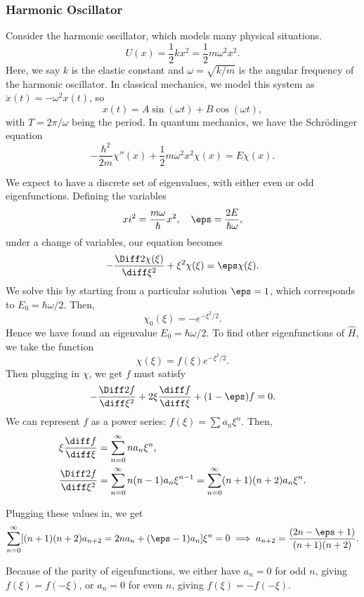 \documentclass[12pt]{article}
\begin{document}
\subsubsection{Harmonic Oscillator}%
\label{subsub:harmonic_oscillator}

Consider the harmonic oscillator, which models many physical situations.
\[
	U(x) = \frac{1}{2}k x^2 = \frac{1}{2}m \omega^2 x^2
.\]
Here, we say $k$ is the elastic constant and $\omega = \sqrt{k/m}$ is the angular frequency of the harmonic oscillator. In classical mechanics, we model this system as $\ddot x (t) = - \omega^2 x(t)$, so
\[
	x(t) = A \sin (\omega t) + B \cos (\omega t)
,\]
with $T = 2\pi/\omega$ being the period. In quantum mechanics, we have the Schr\"{o}dinger equation
\[
	- \frac{\hbar^2}{2m} \chi''(x) + \frac{1}{2} m \omega^2 x^2 \chi(x) =  E \chi(x)
.\]

We expect to have a discrete set of eigenvalues, with either even or odd eigenfunctions. Defining the variables
\[
\\xi^2 = \frac{m \omega}{\hbar} x^2, \quad \eps = \frac{2E}{\hbar \omega}
,\]
under a change of variables, our equation becomes
\[
	- \frac{\Diff2 \chi(\xi)}{\diff \xi^2} + \xi^2 \chi(\xi) = \eps \chi(\xi)
.\]
We solve this by starting from a particular solution $\eps = 1$, which corresponds to $E_0 = \hbar \omega/2$. Then,
\[
	\chi_0(\xi) = - e^{-\xi^2/2}
.\]
Hence we have found an eigenvalue $E_0 = \hbar \omega/2$. To find other eigenfunctions of $\hat H$, we take the function
\[
	\chi(\xi) = f(\xi) e^{-\xi^2/2}
.\]
Then plugging in $\chi$, we get $f$ must satisfy
\[
	- \frac{\Diff2 f}{\diff \xi^2} + 2 \xi \frac{\diff f}{\diff \xi} + (1 - \eps)f = 0
.\]
We can represent $f$ as a power series: $f(\xi) = \sum a_n \xi^{n}$. Then,
\begin{align*}
	\xi \frac{\diff f}{\diff \xi} &= \sum_{n = 0}^{\infty} n a_n \xi^{n}, \\
	\frac{\Diff2 f}{\diff \xi^2} &= \sum_{n = 0}^{\infty}n(n-1)a_n \xi^{n-1} = \sum_{n = 0}^{\infty}(n+1)(n+2)a_n \xi^{n}.
\end{align*}

Plugging these values in, we get
\[
	\sum_{n = 0}^{\infty} [(n+1)(n+2)a_{n+2} = 2 na_n + (\eps - 1)a_n]\xi^{n} = 0 \implies a_{n+2} = \frac{(2n - \eps + 1)}{(n+1)(n+2)}
.\]

Because of the parity of eigenfunctions, we either have $a_n = 0$ for odd $n$, giving $f(\xi) = f(-\xi)$, or $a_n = 0$ for even $n$, giving $f(\xi) = -f(-\xi)$.
\end{document}
